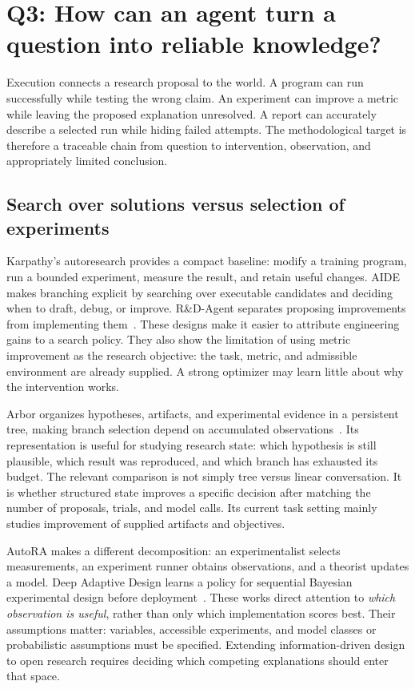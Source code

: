 \section{Q3: How can an agent turn a question into reliable knowledge?}
\label{sec:execution}

Execution connects a research proposal to the world. A program can run successfully while testing the wrong claim. An experiment can improve a metric while leaving the proposed explanation unresolved. A report can accurately describe a selected run while hiding failed attempts. The methodological target is therefore a traceable chain from question to intervention, observation, and appropriately limited conclusion.

\subsection{Search over solutions versus selection of experiments}

Karpathy's autoresearch provides a compact baseline: modify a training program, run a bounded experiment, measure the result, and retain useful changes. AIDE makes branching explicit by searching over executable candidates and deciding when to draft, debug, or improve. R\&D-Agent separates proposing improvements from implementing them~\cite{autoresearch,aide,rd-agent}. These designs make it easier to attribute engineering gains to a search policy. They also show the limitation of using metric improvement as the research objective: the task, metric, and admissible environment are already supplied. A strong optimizer may learn little about why the intervention works.

Arbor organizes hypotheses, artifacts, and experimental evidence in a persistent tree, making branch selection depend on accumulated observations~\cite{arbor}. Its representation is useful for studying research state: which hypothesis is still plausible, which result was reproduced, and which branch has exhausted its budget. The relevant comparison is not simply tree versus linear conversation. It is whether structured state improves a specific decision after matching the number of proposals, trials, and model calls. Its current task setting mainly studies improvement of supplied artifacts and objectives.

AutoRA makes a different decomposition: an experimentalist selects measurements, an experiment runner obtains observations, and a theorist updates a model. Deep Adaptive Design learns a policy for sequential Bayesian experimental design before deployment~\cite{autora,deep-adaptive-design}. These works direct attention to \emph{which observation is useful}, rather than only which implementation scores best. Their assumptions matter: variables, accessible experiments, and model classes or probabilistic assumptions must be specified. Extending information-driven design to open research requires deciding which competing explanations should enter that space.

